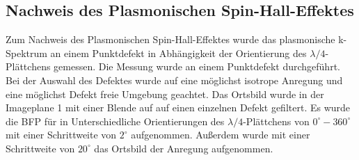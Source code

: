 \documentclass[titlepage]{article}
\begin{document}
	\subsection{Nachweis des Plasmonischen Spin-Hall-Effektes}
	Zum Nachweis des Plasmonischen Spin-Hall-Effektes wurde das plasmonische k-Spektrum an einem Punktdefekt in Abhängigkeit der Orientierung des $\lambda /4$-Plättchens gemessen. Die Messung wurde an einem Punktdefekt durchgeführt. Bei der Auswahl des Defektes wurde auf eine möglichst isotrope Anregung und eine möglichst Defekt freie Umgebung geachtet. Das Ortsbild wurde in der Imageplane 1 mit einer Blende auf auf einen einzelnen Defekt gefiltert. Es wurde die BFP für in Unterschiedliche Orientierungen des $\lambda/4$-Plättchens von $0^\circ-360^\circ$ mit einer Schrittweite von $2^\circ$ aufgenommen. Außerdem wurde mit einer Schrittweite von $20^\circ$ das Ortsbild der Anregung aufgenommen.
	
\end{document}
